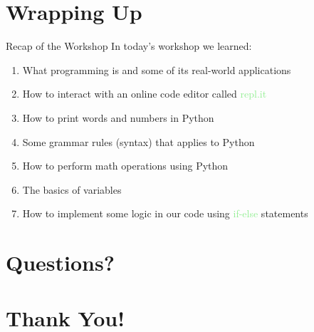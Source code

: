 \documentclass[hyperref={pdfpagemode=FullScreen},aspectratio=169]{beamer}
\begin{document}
  \section{\Huge{Wrapping Up}}

  \begin{frame}{Recap of the Workshop}
    In today's workshop we learned:
    \begin{enumerate}
      \item What programming is and some of its real-world applications
      \item How to interact with an online code editor called \textcolor{lightGreen}{repl.it}
      \item How to print words and numbers in Python 
      \item Some grammar rules (syntax) that applies to Python
      \item How to perform math operations using Python 
      \item The basics of variables
      \item How to implement some logic in our code using \textcolor{lightGreen}{if-else} statements
    \end{enumerate}

  \end{frame}

  \section{\Huge{Questions?}}

  \section{\Huge{Thank You!}}
  
\end{document}
